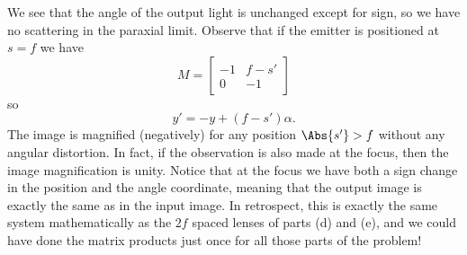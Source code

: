 {\begin{enumerate}
\begin{dmath}
\end{dmath}
%
We see that the angle of the output light is unchanged except for sign, so we have no scattering in the paraxial limit.  Observe that if the emitter is positioned at \(s = f\) we have
%
\begin{equation}\label{eqn:modernOpticsProblemSet1P1:1750}
M =
\begin{bmatrix}
-1 & f - s' \\
0 & -1
\end{bmatrix}
\end{equation}
%
so
%
\begin{equation}\label{eqn:modernOpticsProblemSet1P1:1770}
y' = -y + (f -s') \alpha.
\end{equation}
%
The image is magnified (negatively) for any position \(\Abs{s'} > f\) without any angular distortion.  In fact, if the observation is also made at the focus, then the image magnification is unity.  Notice that at the focus we have both a sign change in the position and the angle coordinate, meaning that the output image is exactly the same as in the input image.  In retrospect, this is exactly the same system mathematically as the \(2f\) spaced lenses of parts (d) and (e), and we could have done the matrix products just once for all those parts of the problem!

\end{enumerate}
} %

